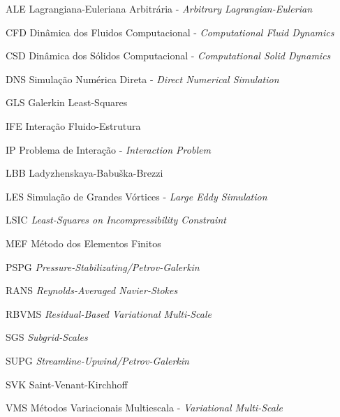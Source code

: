\begin{siglas}
    \item[ALE] Lagrangiana-Euleriana Arbitrária - \textit{Arbitrary Lagrangian-Eulerian}
    \item[CFD] Dinâmica dos Fluidos Computacional - \textit{Computational Fluid Dynamics}
    \item[CSD] Dinâmica dos Sólidos Computacional - \textit{Computational Solid Dynamics}
    \item[DNS] Simulação Numérica Direta - \textit{Direct Numerical Simulation}
    \item[GLS] Galerkin Least-Squares
    \item[IFE] Interação Fluido-Estrutura
    \item[IP] Problema de Interação - \textit{Interaction Problem}
    \item[LBB] Ladyzhenskaya-Babuška-Brezzi
    \item[LES] Simulação de Grandes Vórtices - \textit{Large Eddy Simulation}
    \item[LSIC] \textit{Least-Squares on Incompressibility Constraint}
    \item[MEF] Método dos Elementos Finitos
    \item[PSPG] \textit{Pressure-Stabilizating/Petrov-Galerkin}
    \item[RANS] \textit{Reynolds-Averaged Navier-Stokes}
    \item[RBVMS] \textit{Residual-Based Variational Multi-Scale}
    \item[SGS] \textit{Subgrid-Scales}
    \item[SUPG] \textit{Streamline-Upwind/Petrov-Galerkin}
    \item[SVK] Saint-Venant-Kirchhoff
    \item[VMS] Métodos Variacionais Multiescala - \textit{Variational Multi-Scale}
\end{siglas}